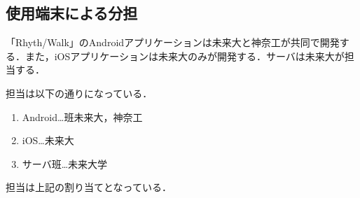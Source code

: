 \subsection{使用端末による分担}
\par
「Rhyth/Walk」のAndroidアプリケーションは未来大と神奈工が共同で開発する．また，iOSアプリケーションは未来大のみが開発する．サーバは未来大が担当する．
\par 担当は以下の通りになっている．
\begin{enumerate}
\item Android…班未来大，神奈工
\item iOS…未来大
\item サーバ班…未来大学
\end{enumerate}
\par
担当は上記の割り当てとなっている．
